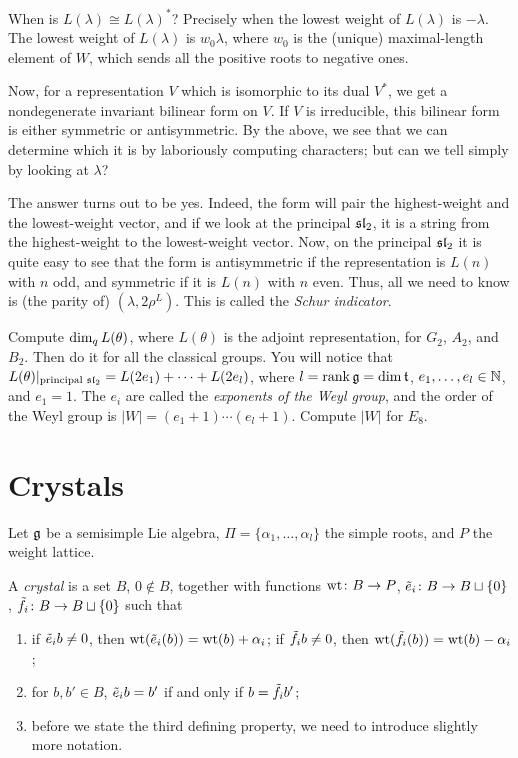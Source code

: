 \begin{remark}
When is $L(\lambda) \cong L(\lambda)^*$? Precisely when the lowest weight of
$L(\lambda)$ is $-\lambda$. The lowest weight of $L(\lambda)$ is $w_0\lambda$,
where $w_0$ is the (unique) maximal-length element of $W$, which sends all the
positive roots to negative ones.

Now, for a representation $V$ which is isomorphic to its dual $V^*$, we get a
nondegenerate invariant bilinear form on $V$. If $V$ is irreducible, this
bilinear form is either symmetric or antisymmetric. By the above, we see that
we can determine which it is by laboriously computing characters; but can we
tell simply by looking at $\lambda$?

The answer turns out to be yes. Indeed, the form will pair the highest-weight
and the lowest-weight vector, and if we look at the principal $\sl_2$, it is a
string from the highest-weight to the lowest-weight vector. Now, on the
principal $\sl_2$ it is quite easy to see that the form is antisymmetric if the
representation is $L(n)$ with $n$ odd, and symmetric if it is $L(n)$ with $n$
even. Thus, all we need to know is (the parity of) $(\lambda, 2\rho^L)$. This
is called the \emph{Schur indicator}.
\end{remark}


\begin{exercise}
Compute $\dimq L(\theta)$, where $L(\theta)$ is the adjoint representation, for
$G_2$, $A_2$, and $B_2$. Then do it for all the classical groups. You will
notice that $L(\theta)|_{\text{principal } \sl_2} = L(2e_1) + \dots + L(2e_l)$,
where $l = \rank \g = \dim \at$, $e_1, \dots, e_l \in \N$, and $e_1 = 1$. The
$e_i$ are called the \emph{exponents of the Weyl group}, and the order of the
Weyl group is $|W| = (e_1 + 1)\cdots(e_l + 1)$. Compute $|W|$ for $E_8$.
\end{exercise}

\section{Crystals}

Let $\g$ be a semisimple Lie algebra, $\Pi = \{\alpha_1, \dots, \alpha_l\}$ the
simple roots, and $P$ the weight lattice.

\begin{definition}
A \emph{crystal} is a set $B$, $0 \notin B$, together with functions
$\wt\colon B \to P$, $\te_i\colon B \to B \sqcup \{0\}$,
$\tf_i\colon B \to B \sqcup \{0\}$ such that
\begin{enumerate}
  \item if $\te_ib \neq 0$, then $\wt(\te_i(b)) = \wt(b) + \alpha_i$; if
    $\tf_ib \neq 0$, then $\wt(\tf_i(b)) = \wt(b) - \alpha_i$;
  \item for $b, b' \in B$, $\te_ib = b'$ if and only if $b = \tf_ib'$;
  \item before we state the third defining property, we need to introduce
    slightly more notation.
\end{enumerate}
\end{definition}

